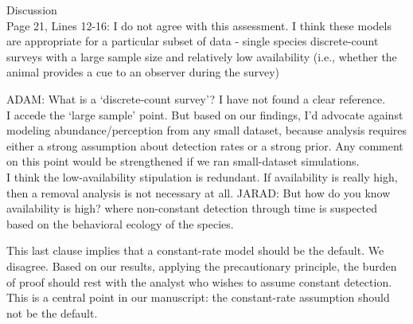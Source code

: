 \documentclass[12pt]{article}
\renewenvironment{quote}  %
              {\list{}{\rightmargin\leftmargin}\normalfont%
               \item\relax}
              {\endlist}
\newcommand{\adam}[1]{{\color{blue} ADAM: #1}}
\newcommand{\jarad}[1]{{\color{Orange} JARAD: #1}}
\begin{document}
Discussion\\
Page 21, Lines 12-16:  I do not agree with this assessment.  I think these models are appropriate for a particular subset of data - single species discrete-count surveys with a large sample size and relatively low availability (i.e., whether the animal provides a cue to an observer during the survey)   
\begin{quote}
\adam{What is a `discrete-count survey'?  I have not found a clear reference.\\
I accede the `large sample' point.  But based on our findings, I'd advocate against modeling abundance/perception from any small dataset, because analysis requires either a strong assumption about detection rates or a strong prior.  Any comment on this point would be strengthened if we ran small-dataset simulations.\\
I think the low-availability stipulation is redundant.  If availability is really high, then a removal analysis is not necessary at all.}
\jarad{But how do you know availability is high?}
\end{quote}
where non-constant detection through time is suspected based on the behavioral ecology of the species.
\begin{quote}
This last clause implies that a constant-rate model should be the default.
We disagree.
Based on our results, applying the precautionary principle, the burden of proof should rest with the analyst who wishes to assume constant detection.
This is a central point in our manuscript: the constant-rate assumption should not be the default.
\end{quote}
\end{document}
